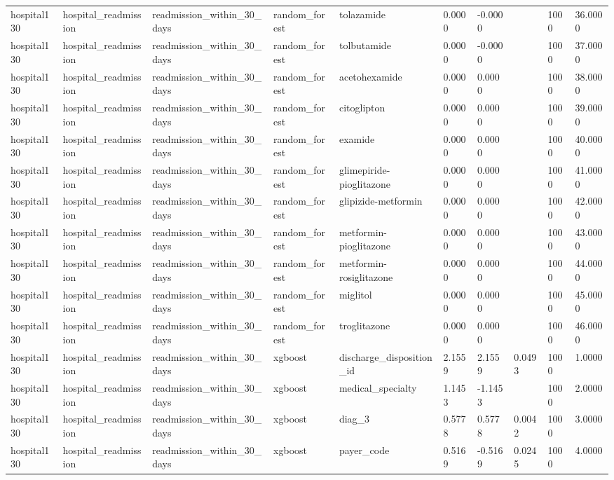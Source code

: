 \begin{tabular}{llllllllll}
hospital130 & hospital\_readmission & readmission\_within\_30\_days & random\_forest & tolazamide & 0.0000 & -0.0000 &  & 1000 & 36.0000 \\
hospital130 & hospital\_readmission & readmission\_within\_30\_days & random\_forest & tolbutamide & 0.0000 & -0.0000 &  & 1000 & 37.0000 \\
hospital130 & hospital\_readmission & readmission\_within\_30\_days & random\_forest & acetohexamide & 0.0000 & 0.0000 &  & 1000 & 38.0000 \\
hospital130 & hospital\_readmission & readmission\_within\_30\_days & random\_forest & citoglipton & 0.0000 & 0.0000 &  & 1000 & 39.0000 \\
hospital130 & hospital\_readmission & readmission\_within\_30\_days & random\_forest & examide & 0.0000 & 0.0000 &  & 1000 & 40.0000 \\
hospital130 & hospital\_readmission & readmission\_within\_30\_days & random\_forest & glimepiride-pioglitazone & 0.0000 & 0.0000 &  & 1000 & 41.0000 \\
hospital130 & hospital\_readmission & readmission\_within\_30\_days & random\_forest & glipizide-metformin & 0.0000 & 0.0000 &  & 1000 & 42.0000 \\
hospital130 & hospital\_readmission & readmission\_within\_30\_days & random\_forest & metformin-pioglitazone & 0.0000 & 0.0000 &  & 1000 & 43.0000 \\
hospital130 & hospital\_readmission & readmission\_within\_30\_days & random\_forest & metformin-rosiglitazone & 0.0000 & 0.0000 &  & 1000 & 44.0000 \\
hospital130 & hospital\_readmission & readmission\_within\_30\_days & random\_forest & miglitol & 0.0000 & 0.0000 &  & 1000 & 45.0000 \\
hospital130 & hospital\_readmission & readmission\_within\_30\_days & random\_forest & troglitazone & 0.0000 & 0.0000 &  & 1000 & 46.0000 \\
hospital130 & hospital\_readmission & readmission\_within\_30\_days & xgboost & discharge\_disposition\_id & 2.1559 & 2.1559 & 0.0493 & 1000 & 1.0000 \\
hospital130 & hospital\_readmission & readmission\_within\_30\_days & xgboost & medical\_specialty & 1.1453 & -1.1453 &  & 1000 & 2.0000 \\
hospital130 & hospital\_readmission & readmission\_within\_30\_days & xgboost & diag\_3 & 0.5778 & 0.5778 & 0.0042 & 1000 & 3.0000 \\
hospital130 & hospital\_readmission & readmission\_within\_30\_days & xgboost & payer\_code & 0.5169 & -0.5169 & 0.0245 & 1000 & 4.0000 \\

\end{tabular}
